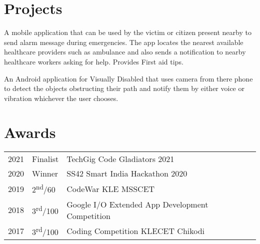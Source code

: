 \documentclass[]{deedy-resume-openfont}
\begin{document}
\begin{minipage}[t]{0.66\textwidth}

\section{Projects}
A mobile application that can be used by the victim or
citizen present nearby to send alarm message during emergencies. The app locates the
nearest available healthcare providers such as ambulance and also sends a notification to nearby healthcare workers asking for help. Provides First aid tips.
\sectionsep

An Android application for Visually Disabled that uses camera from there phone to detect the objects obstructing
their path and notify them by either voice or vibration whichever the user chooses. %
\sectionsep


\section{Awards} 
\begin{tabular}{rll}
2021	     & Finalist  & TechGig Code Gladiators 2021\\
2020	     & Winner  & SS42 Smart India Hackathon 2020\\
2019	     & 2\textsuperscript{nd}/60  & CodeWar KLE MSSCET \\
2018     & 3\textsuperscript{rd}/100 & Google I/O Extended App Development Competition  \\
2017     & 3\textsuperscript{rd}/100 & Coding Competition KLECET Chikodi \\
\end{tabular}
\sectionsep

\end{minipage} 
\end{document}
